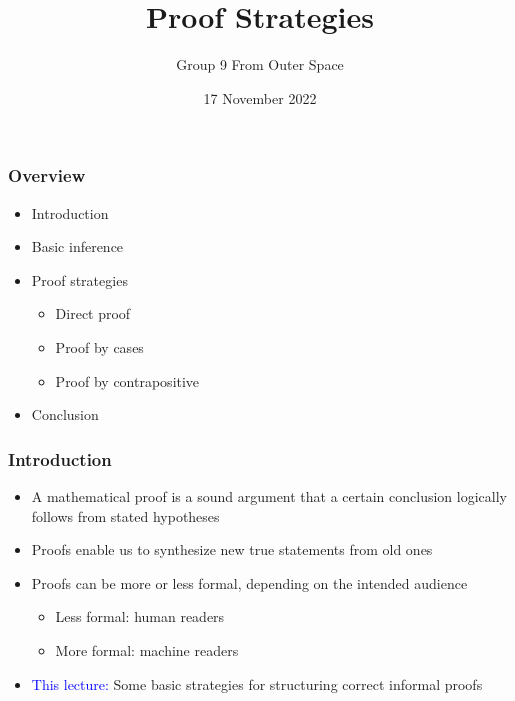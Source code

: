 \documentclass{beamer}
\title{Proof Strategies}
\author{Group 9 From Outer Space}
\date{17 November 2022}
\begin{document}
\begin{frame}
  \titlepage
\end{frame}

\begin{frame}
  \frametitle{Overview}
  \begin{itemize}
  \item Introduction\\
  \item Basic inference\\
  \item Proof strategies
    \begin{itemize}
    \item Direct proof
    \item Proof by cases
    \item Proof by contrapositive\\
    \end{itemize}
  \item Conclusion
  \end{itemize}
\end{frame}

\begin{frame}
  \frametitle{Introduction}
  \begin{itemize}
  \item A mathematical proof is a sound argument that a certain
    conclusion logically follows from stated hypotheses\\
  \item Proofs enable us to synthesize new true statements from old
    ones\\
  \item Proofs can be more or less formal, depending on the intended
    audience
    \begin{itemize}
    \item Less formal: human readers
    \item More formal: machine readers\\
    \end{itemize}
  \item \textcolor{blue}{This lecture:} Some basic strategies for
    structuring correct informal proofs
  \end{itemize}
\end{frame}





\end{document}
